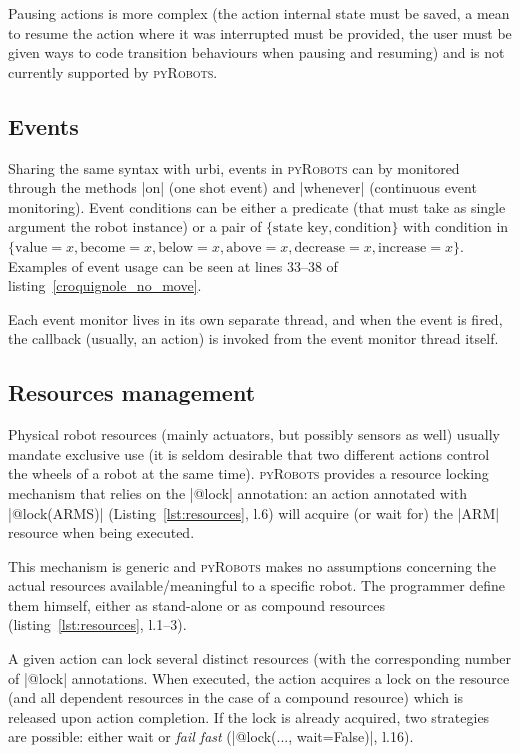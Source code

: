 \documentclass[a4paper, 10pt, conference]{ieeeconf}      %
\newcommand{\pyRobots}{\textsc{pyRobots}}
\begin{document}
Pausing actions is more complex (the action internal state must be saved, a mean
to resume the action where it was interrupted must be provided, the user must be
given ways to code transition behaviours when pausing and resuming) and is not
currently supported by \pyRobots{}.

\subsection{Events}

Sharing the same syntax with {\sc urbi}, events in \pyRobots{} can by monitored
through the methods \python|on| (one shot event) and \python|whenever|
(continuous event monitoring). Event conditions can be either a predicate (that
must take as single argument the robot instance) or a pair of $\{\text{state
key}, \text{condition}\}$ with condition in $\{\text{value}=x, \text{become}=x,
\text{below}=x, \text{above}=x, \text{decrease}=x, \text{increase}=x\}$.
Examples of event usage can be seen at lines 33--38 of
listing~\ref{croquignole_no_move}.

Each event monitor lives in its own separate thread, and when the event is fired,
the callback (usually, an action) is invoked from the event monitor thread
itself.

\subsection{Resources management}

Physical robot resources (mainly actuators, but possibly sensors as
well) usually mandate exclusive use (it is seldom desirable that two different actions
control the wheels of a robot at the same time). \pyRobots{} provides a resource
locking mechanism that relies on the \python|@lock| annotation: an action
annotated with \python|@lock(ARMS)| (Listing~\ref{lst:resources}, l.6) will
acquire (or wait for) the \python|ARM| resource when being executed.

This mechanism is generic and \pyRobots{} makes no assumptions concerning the
actual resources available/meaningful to a specific robot. The
programmer define them himself, either as stand-alone or as compound
resources (listing~\ref{lst:resources}, l.1--3).

A given action can lock several distinct resources (with the corresponding
number of \python|@lock| annotations. When executed, the
action acquires a lock on the resource (and all dependent resources in the case
of a compound resource) which is released upon action completion. If the lock is
already acquired, two strategies are possible: either wait or \emph{fail fast}
(\python|@lock(..., wait=False)|, l.16).
\end{document}
